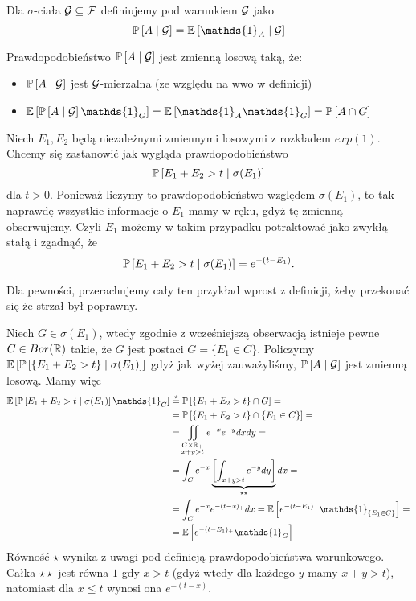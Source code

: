 \begin{definition}\label{prawdopodobienstwo warunkowe}
  Dla $\sigma$-ciała $\mathcal{G}\subseteq\mathcal{F}$ definiujemy  pod warunkiem $\mathcal{G}$ jako
  $$\prob{A}{\set{G}}=\expected{\mathds{1}_A}{\set{G}}$$
\end{definition}

Prawdopodobieństwo $\prob{A}{\set{G}}$ jest zmienną losową taką, że:
\begin{itemize}
  \item $\prob{A}{\set{G}}$ jest $\mathcal{G}$-mierzalna (ze względu na wwo w definicji)
  \item $\expected{\prob{A}{\set{G}}\mathds{1}_G}=\expected{\mathds{1}_A\mathds{1}_G}=\prob{A\cap G}$
\end{itemize}

\begin{example}
\item Niech $E_1,E_2$ będą niezależnymi zmiennymi losowymi z rozkładem $exp(1)$. Chcemy się zastanowić jak wygląda prawdopodobieństwo
  $$\prob{E_1+E_2>t}{\sigma(E_1)}$$
  dla $t>0$. Ponieważ liczymy to prawdopodobieństwo względem $\sigma(E_1)$, to tak naprawdę wszystkie informacje o $E_1$ mamy w ręku, gdyż tę zmienną obserwujemy. Czyli $E_1$ możemy w takim przypadku potraktować jako zwykłą stałą i zgadnąć, że
  $$\prob{E_1+E_2>t}{\sigma(E_1)}=e^{-(t-E_1)}.$$

  Dla pewności, przerachujemy cały ten przykład wprost z definicji, żeby przekonać się że strzał był poprawny.

  Niech $G\in\sigma(E_1)$, wtedy zgodnie z wcześniejszą obserwacją istnieje pewne $C\in Bor(\operatorname{\mathbb{R}})$ takie, że $G$ jest postaci $G=\{E_1\in C\}$. Policzymy $\expected{\prob{\{E_1+E_2>t\}}{\sigma(E_1)}}$ gdyż jak wyżej zauważyliśmy, $\prob{A}{\set{G}}$ jest zmienną losową. Mamy więc
  \begin{align*}
    \expected{\prob{E_1+E_2>t}{\sigma(E_1)}\mathds{1}_G}&\overset{\star}{=}\prob{\{E_1+E_2>t\}\cap G}=\\
                                                        &=\prob{\{E_1+E_2>t\}\cap\{E_1\in C\}}=\\
                                                        &=\iint\limits_{\substack{C\times\R_+\\x+y>t}}e^{-x}e^{-y}dxdy=\\
                                                        &=\int_Ce^{-x}\underbrace{\left[\int_{x+y>t}e^{-y}dy\right]}_{\star\star}dx=\\
                                                        &=\int_Ce^{-x}e^{-(t-x)_+}dx=\expected{e^{-(t-E_1)_+}\mathds{1}_{\{E_1\in C\}}}=\\
                                                        &=\expected{e^{-(t-E_1)_+}\mathds{1}_G}
  \end{align*}
  Równość $\star$ wynika z uwagi pod definicją prawdopodobieństwa warunkowego. Całka $\star\star$ jest równa $1$ gdy $x>t$ (gdyż wtedy dla każdego $y$ mamy $x+y>t$), natomiast dla $x\leq t$ wynosi ona $e^{-(t-x)}$.
\end{example}
